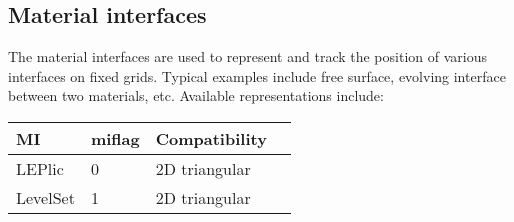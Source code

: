 \documentclass[draft]{article}
\begin{document}
\subsection{Material interfaces}
\label{materialinterfaces}
The material interfaces are used to represent and track the position of 
various interfaces on fixed grids. Typical examples include free surface, 
evolving interface between two materials, etc.
Available representations include:

\begin{tabular}{|l|l|l|l|}                                                      
\hline                                                                          
MI & miflag & Compatibility  \\
\hline
LEPlic & 0 & 2D triangular \\
LevelSet & 1 & 2D triangular \\
\hline
\end{tabular}                                                                   
\end{document}
